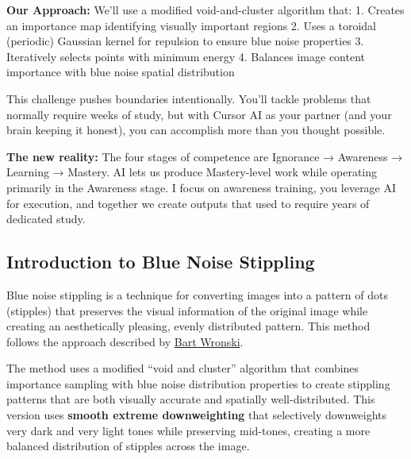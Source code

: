 \documentclass[
  letterpaper,
  DIV=11,
  numbers=noendperiod]{scrartcl}
\begin{document}
\textbf{Our Approach:} We'll use a modified void-and-cluster algorithm
that: 1. Creates an importance map identifying visually important
regions 2. Uses a toroidal (periodic) Gaussian kernel for repulsion to
ensure blue noise properties 3. Iteratively selects points with minimum
energy 4. Balances image content importance with blue noise spatial
distribution

\begin{tcolorbox}[enhanced jigsaw, coltitle=black, breakable, colframe=quarto-callout-warning-color-frame, opacitybacktitle=0.6, colbacktitle=quarto-callout-warning-color!10!white, opacityback=0, toprule=.15mm, bottomtitle=1mm, colback=white, left=2mm, title=\textcolor{quarto-callout-warning-color}{\faExclamationTriangle}\hspace{0.5em}{⚠️ AI Partnership Required}, toptitle=1mm, rightrule=.15mm, leftrule=.75mm, bottomrule=.15mm, titlerule=0mm, arc=.35mm]

This challenge pushes boundaries intentionally. You'll tackle problems
that normally require weeks of study, but with Cursor AI as your partner
(and your brain keeping it honest), you can accomplish more than you
thought possible.

\textbf{The new reality:} The four stages of competence are Ignorance →
Awareness → Learning → Mastery. AI lets us produce Mastery-level work
while operating primarily in the Awareness stage. I focus on awareness
training, you leverage AI for execution, and together we create outputs
that used to require years of dedicated study.

\end{tcolorbox}

\subsection{Introduction to Blue Noise
Stippling}\label{introduction-to-blue-noise-stippling}

Blue noise stippling is a technique for converting images into a pattern
of dots (stipples) that preserves the visual information of the original
image while creating an aesthetically pleasing, evenly distributed
pattern. This method follows the approach described by
\href{https://bartwronski.com/2022/08/31/progressive-image-stippling-and-greedy-blue-noise-importance-sampling/}{Bart
Wronski}.

The method uses a modified ``void and cluster'' algorithm that combines
importance sampling with blue noise distribution properties to create
stippling patterns that are both visually accurate and spatially
well-distributed. This version uses \textbf{smooth extreme
downweighting} that selectively downweights very dark and very light
tones while preserving mid-tones, creating a more balanced distribution
of stipples across the image.
\end{document}
